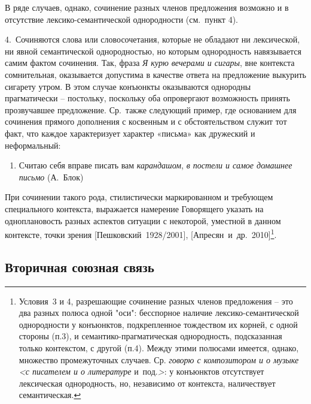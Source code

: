 В ряде случаев, однако, сочинение разных членов предложения возможно и в
отсутствие лексико-семантической однородности (см.~пункт 4).

4.~Сочиняются слова или словосочетания, которые не обладают ни
лексической, ни явной семантической однородностью, но которым
однородность навязывается самим фактом сочинения. Так, фраза \emph{Я
курю вечерами и сигары}, вне контекста сомнительная, оказывается
допустима в качестве ответа на предложение выкурить сигарету утром. В
этом случае конъюнкты оказываются однородны прагматически -- постольку,
поскольку оба опровергают возможность принять прозвучавшее предложение.
Ср.~также следующий пример, где основанием для сочинения прямого
дополнения с косвенным и с обстоятельством служит тот факт, что каждое
характеризует характер «письма» как дружеский и неформальный:

\begin{enumerate}
\def\labelenumi{(\arabic{enumi})}
\setcounter{enumi}{42}
\item
  Считаю себя вправе писать вам \emph{карандашом}, \emph{в постели и
  самое домашнее письмо} (А.~Блок)
\end{enumerate}

При сочинении такого рода, стилистически маркированном и требующем
специального контекста, выражается намерение Говорящего указать на
одноплановость разных аспектов ситуации с некоторой, уместной в данном
контексте, точки зрения {[}Пешковский~1928/2001{]},
{[}Апресян~и~др.~2010{]}\footnote{Условия~3 и 4, разрешающие сочинение
  разных членов предложения -- это два разных полюса одной "оси":
  бесспорное наличие лексико-семантической однородности у конъюнктов,
  подкрепленное тождеством их корней, с одной стороны (п.3), и
  семантико-прагматическая однородность, подсказанная только контекстом,
  с другой (п.4). Между этими полюсами имеется, однако, множество
  промежуточных случаев. Ср. \emph{говорю с композитором и о музыке
  \textless с писателем и о литературе} и~под.\emph{\textgreater{}}: у
  конъюнктов отсутствует лексическая однородность, но, независимо от
  контекста, наличествует семантическая.}.

\hypertarget{ux432ux442ux43eux440ux438ux447ux43dux430ux44f-ux441ux43eux44eux437ux43dux430ux44f-ux441ux432ux44fux437ux44c}{%
\subsection{Вторичная союзная
связь}\label{ux432ux442ux43eux440ux438ux447ux43dux430ux44f-ux441ux43eux44eux437ux43dux430ux44f-ux441ux432ux44fux437ux44c}}

